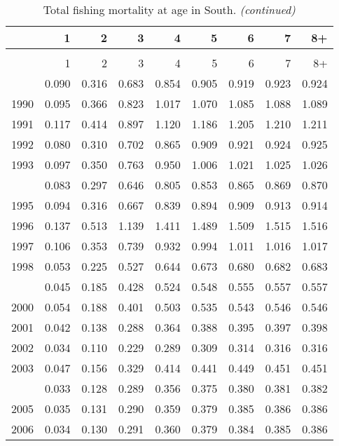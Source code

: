 \documentclass[
]{article}
\begin{document}
\begin{longtable}[t]{lrrrrrrrr}
\caption{\label{tab:South-region-FAA-table}Total fishing mortality at age in South.}\\
\toprule
  & 1 & 2 & 3 & 4 & 5 & 6 & 7 & 8+\\
\midrule
\endfirsthead
\caption[]{Total fishing mortality at age in South. \textit{(continued)}}\\
\toprule
  & 1 & 2 & 3 & 4 & 5 & 6 & 7 & 8+\\
\midrule
\endhead

\endfoot
\bottomrule
\endlastfoot
1989 & 0.090 & 0.316 & 0.683 & 0.854 & 0.905 & 0.919 & 0.923 & 0.924\\
1990 & 0.095 & 0.366 & 0.823 & 1.017 & 1.070 & 1.085 & 1.088 & 1.089\\
1991 & 0.117 & 0.414 & 0.897 & 1.120 & 1.186 & 1.205 & 1.210 & 1.211\\
1992 & 0.080 & 0.310 & 0.702 & 0.865 & 0.909 & 0.921 & 0.924 & 0.925\\
1993 & 0.097 & 0.350 & 0.763 & 0.950 & 1.006 & 1.021 & 1.025 & 1.026\\
\addlinespace
1994 & 0.083 & 0.297 & 0.646 & 0.805 & 0.853 & 0.865 & 0.869 & 0.870\\
1995 & 0.094 & 0.316 & 0.667 & 0.839 & 0.894 & 0.909 & 0.913 & 0.914\\
1996 & 0.137 & 0.513 & 1.139 & 1.411 & 1.489 & 1.509 & 1.515 & 1.516\\
1997 & 0.106 & 0.353 & 0.739 & 0.932 & 0.994 & 1.011 & 1.016 & 1.017\\
1998 & 0.053 & 0.225 & 0.527 & 0.644 & 0.673 & 0.680 & 0.682 & 0.683\\
\addlinespace
1999 & 0.045 & 0.185 & 0.428 & 0.524 & 0.548 & 0.555 & 0.557 & 0.557\\
2000 & 0.054 & 0.188 & 0.401 & 0.503 & 0.535 & 0.543 & 0.546 & 0.546\\
2001 & 0.042 & 0.138 & 0.288 & 0.364 & 0.388 & 0.395 & 0.397 & 0.398\\
2002 & 0.034 & 0.110 & 0.229 & 0.289 & 0.309 & 0.314 & 0.316 & 0.316\\
2003 & 0.047 & 0.156 & 0.329 & 0.414 & 0.441 & 0.449 & 0.451 & 0.451\\
\addlinespace
2004 & 0.033 & 0.128 & 0.289 & 0.356 & 0.375 & 0.380 & 0.381 & 0.382\\
2005 & 0.035 & 0.131 & 0.290 & 0.359 & 0.379 & 0.385 & 0.386 & 0.386\\
2006 & 0.034 & 0.130 & 0.291 & 0.360 & 0.379 & 0.384 & 0.385 & 0.386\\

\end{longtable}
\end{document}
